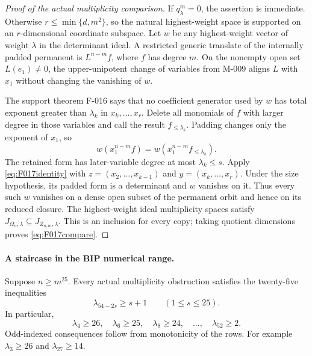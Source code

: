 \begin{proof}[Proof of the actual multiplicity comparison]
If \(q^m_\lambda=0\), the assertion is immediate. Otherwise
\(r\leq\min\{d,m^2\}\), so the natural highest-weight
space is supported on an \(r\)-dimensional coordinate subspace.
Let \(w\) be any highest-weight vector of weight \(\lambda\)
in the determinant ideal. A restricted generic translate
of the internally padded permanent is \(L^{n-m}f\),
where \(f\) has degree \(m\). On the nonempty open set
\(L(e_1)\ne0\), the upper-unipotent change of variables
from M-009 aligns \(L\) with \(x_1\) without changing
the vanishing of \(w\).

The support theorem F-016 says that no coefficient generator
used by \(w\) has total exponent greater than \(\lambda_k\)
in \(x_k,\ldots,x_r\). Delete all monomials of \(f\)
with larger degree in those variables and call the result
\(f_{\leq\lambda_k}\). Padding changes only the exponent
of \(x_1\), so
\[
       w(x_1^{n-m}f)=w(x_1^{n-m}f_{\leq\lambda_k}).
\]
The retained form has later-variable degree at most
\(\lambda_k\leq s\). Apply \eqref{eq:F017identity}
with \(z=(x_2,\ldots,x_{k-1})\) and
\(y=(x_k,\ldots,x_r)\). Under the size hypothesis, its
padded form is a determinant and \(w\) vanishes on it.
Thus every such \(w\) vanishes on a dense open subset
of the permanent orbit and hence on its reduced closure.
The highest-weight ideal multiplicity spaces satisfy
\(J_{\Omega_n,\lambda}\subseteq J_{Z_{n,m},\lambda}\).
This is an inclusion for every copy; taking quotient dimensions
proves \eqref{eq:F017compare}.
\end{proof}

\paragraph{A staircase in the BIP numerical range.}
Suppose \(n\geq m^{25}\). Every actual multiplicity
obstruction satisfies the twenty-five inequalities
\begin{equation}\label{eq:F017BIP}
                \lambda_{54-2s}\geq s+1
                               \qquad(1\leq s\leq25).
\end{equation}
In particular,
\[
       \lambda_4\geq26,\quad\lambda_6\geq25,\quad
       \lambda_8\geq24,\quad\ldots,\quad\lambda_{52}\geq2.
\]
Odd-indexed consequences follow from monotonicity of the rows.
For example \(\lambda_3\geq26\) and \(\lambda_{27}\geq14\).

